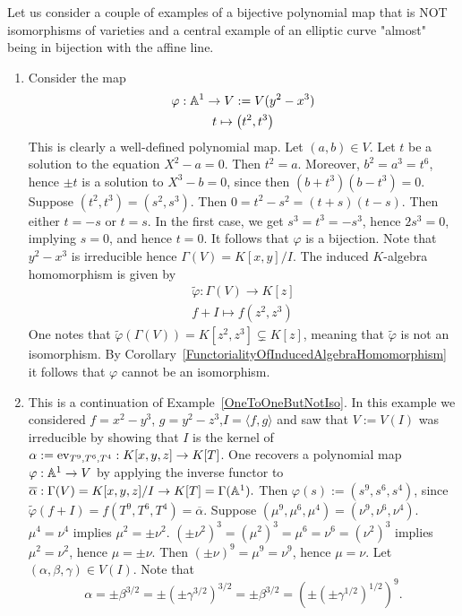 \begin{example}\label{ExamplesAndNonExamplePolynomialMapsAndIsomorphisms}
    Let us consider a couple of examples of a bijective polynomial map that is NOT isomorphisms of varieties and a central example of an elliptic curve "almost" being in bijection with the affine line. 
    \begin{enumerate}
        \item Consider the map 
        \begin{gather*}
            \varphi : \mathbb{A}^1 \rightarrow V:= V(y^2-x^3)\\
            t \mapsto \left(t^2,t^3\right)
        \end{gather*}
        This is clearly a well-defined polynomial map. Let $(a,b)\in V$. Let $t$ be a solution to the equation $X^2-a=0$. Then $t^2 = a$. Moreover, $b^2 = a^3 = t^6$, hence $\pm t$ is a solution to $X^3-b=0$, since then $(b+t^3)(b-t^3)=0$. Suppose $\left(t^2,t^3\right)=\left(s^2,s^3\right)$. Then $0=t^2-s^2=(t+s)(t-s)$. Then either $t=-s$ or $t=s$. In the first case, we get $s^3 = t^3 = -s^3$, hence $2s^3 =0$, implying $s=0$, and hence $t=0$. It follows that $\varphi$ is a bijection. Note that $y^2-x^3$ is irreducible hence $\Gamma(V)=K[x,y]/I$. The induced $K$-algebra homomorphism is given by 
        \begin{gather*}
            \widetilde{\varphi}: \Gamma(V) \rightarrow K[z]\\
            f + I \mapsto f(z^2,z^3)            
        \end{gather*}
        One notes that $\widetilde{\varphi}(\Gamma(V))= K[z^2,z^3]\subsetneq K[z]$, meaning that $\widetilde{\varphi}$ is not an isomorphism. By Corollary~\ref{FunctorialityOfInducedAlgebraHomomorphism} it follows that $\varphi$ cannot be an isomorphism. 
        \item 
            This is a continuation of Example~\ref{OneToOneButNotIso}. In this example we considered $f=x^2-y^3$, $g=y^2-z^3$,$I=\langle f,g\rangle$ and saw that $V:=V(I)$ was irreducible by showing that $I$ is the kernel of $\alpha:= \mathrm{ev}_{T^9,T^6,T^4}: K[x,y,z]\rightarrow K[T]$. One recovers a polynomial map $\varphi: \mathbb{A}^1 \rightarrow V$ by applying the inverse functor to $\overline{\alpha}: \Gamma(V)=K[x,y,z]/I\rightarrow K[T]=\Gamma(\mathbb{A}^1).$ Then $\varphi(s) := (s^9,s^6,s^4)$, since $\widetilde{\varphi}(f+I)=f(T^9,T^6,T^4)=\overline{\alpha}$. Suppose $(\mu^9,\mu^6,\mu^4)=(\nu^9,\nu^6,\nu^4)$. $\mu^4=\nu^4$ implies $\mu^2=\pm \nu^2$. $(\pm\nu^2)^3=(\mu^2)^3=\mu^6=\nu^6=(\nu^2)^3$ implies $\mu^2=\nu^2$, hence $\mu=\pm \nu$. Then $(\pm \nu)^9=\mu^9=\nu^9$, hence $\mu=\nu$. Let $(\alpha,\beta,\gamma)\in V(I)$. Note that $$\alpha = \pm \beta^{3/2}= \pm( \pm \gamma^{3/2})^{3/2}=\pm \beta^{3/2}= (\pm( \pm \gamma^{1/2})^{1/2})^9.$$ 

\end{enumerate}
\end{example}
